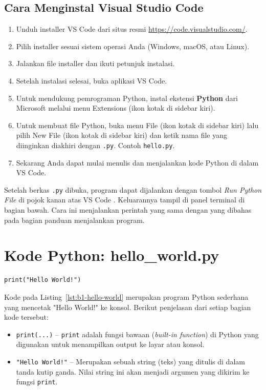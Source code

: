 \subsection{Cara Menginstal Visual Studio Code}

\begin{enumerate}
    \item Unduh installer VS Code dari situs resmi \url{https://code.visualstudio.com/}.
    \item Pilih installer sesuai sistem operasi Anda (Windows, macOS, atau Linux).
    \item Jalankan file installer dan ikuti petunjuk instalasi.
    \item Setelah instalasi selesai, buka aplikasi VS Code.
    \item Untuk mendukung pemrograman Python, instal ekstensi \textbf{Python} dari Microsoft melalui menu Extensions (ikon kotak di sidebar kiri).
    \item Untuk membuat file Python, buka menu File (ikon kotak di sidebar kiri) lalu pilih New File (ikon kotak di sidebar kiri) dan ketik nama file yang diinginkan diakhiri dengan \texttt{.py}. Contoh \texttt{hello.py}.
    \item Sekarang Anda dapat mulai menulis dan menjalankan kode Python di dalam VS Code.
\end{enumerate}

Setelah berkas \texttt{.py} dibuka, program dapat dijalankan dengan tombol \textit{Run Python File} di pojok kanan atas VS Code \cite{vscode-python}. Keluarannya tampil di panel terminal di bagian bawah. Cara ini menjalankan perintah yang sama dengan yang dibahas pada bagian panduan menjalankan program.

\section{Kode Python: hello_world.py}
\label{sec:hello-world-code}

\begin{lstlisting}[style=PythonStyle, caption={Kode Python: hello_world.py}, label={lst:b1-hello-world}]
print("Hello World!")
\end{lstlisting}

Kode pada Listing~\ref{lst:b1-hello-world} merupakan program Python sederhana yang mencetak "Hello World!" ke konsol. Berikut penjelasan dari setiap bagian kode tersebut:

\begin{itemize}
\item \texttt{print(...)} – \texttt{print} adalah fungsi bawaan (\textit{built-in function}) di Python yang digunakan untuk menampilkan output ke layar atau konsol.
\item \texttt{"Hello World!"} – Merupakan sebuah string (teks) yang ditulis di dalam tanda kutip ganda. Nilai string ini akan menjadi argumen yang dikirim ke fungsi \texttt{print}.
\end{itemize}


